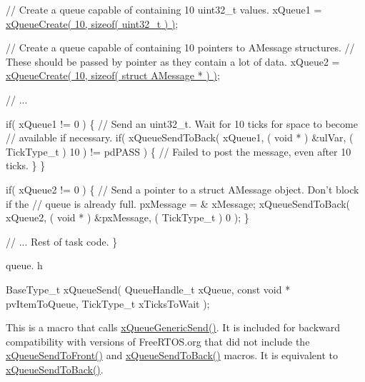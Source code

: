\begin{DoxyPre}   // Create a queue capable of containing 10 uint32\_t values.
   xQueue1 = \hyperlink{queue_8h_aeb858b824bd74a934ea7ebb81af2a6bb}{xQueueCreate( 10, sizeof( uint32\_t ) )};\end{DoxyPre}



\begin{DoxyPre}   // Create a queue capable of containing 10 pointers to AMessage structures.
   // These should be passed by pointer as they contain a lot of data.
   xQueue2 = \hyperlink{queue_8h_aeb858b824bd74a934ea7ebb81af2a6bb}{xQueueCreate( 10, sizeof( struct AMessage * ) )};\end{DoxyPre}



\begin{DoxyPre}   // ...\end{DoxyPre}



\begin{DoxyPre}   if( xQueue1 != 0 )
   \{
    // Send an uint32\_t.  Wait for 10 ticks for space to become
    // available if necessary.
    if( xQueueSendToBack( xQueue1, ( void * ) \&ulVar, ( TickType\_t ) 10 ) != pdPASS )
    \{
        // Failed to post the message, even after 10 ticks.
    \}
   \}\end{DoxyPre}



\begin{DoxyPre}   if( xQueue2 != 0 )
   \{
    // Send a pointer to a struct AMessage object.  Don't block if the
    // queue is already full.
    pxMessage = \& xMessage;
    xQueueSendToBack( xQueue2, ( void * ) \&pxMessage, ( TickType\_t ) 0 );
   \}\end{DoxyPre}



\begin{DoxyPre}   // ... Rest of task code.
\}
\end{DoxyPre}


queue. h 
\begin{DoxyPre}
BaseType\_t xQueueSend(
                          QueueHandle\_t xQueue,
                          const void * pvItemToQueue,
                          TickType\_t xTicksToWait
                     );
  \end{DoxyPre}


This is a macro that calls \hyperlink{queue_8h_a7ce86d1026e0c3055a523935bf53c0b3}{x\+Queue\+Generic\+Send()}. It is included for backward compatibility with versions of Free\+R\+T\+O\+S.\+org that did not include the \hyperlink{queue_8h_aa612fcc2b1ceee0200f34b942e300b41}{x\+Queue\+Send\+To\+Front()} and \hyperlink{queue_8h_a81d24a2c1199d58efb76fbee15853112}{x\+Queue\+Send\+To\+Back()} macros. It is equivalent to \hyperlink{queue_8h_a81d24a2c1199d58efb76fbee15853112}{x\+Queue\+Send\+To\+Back()}.

